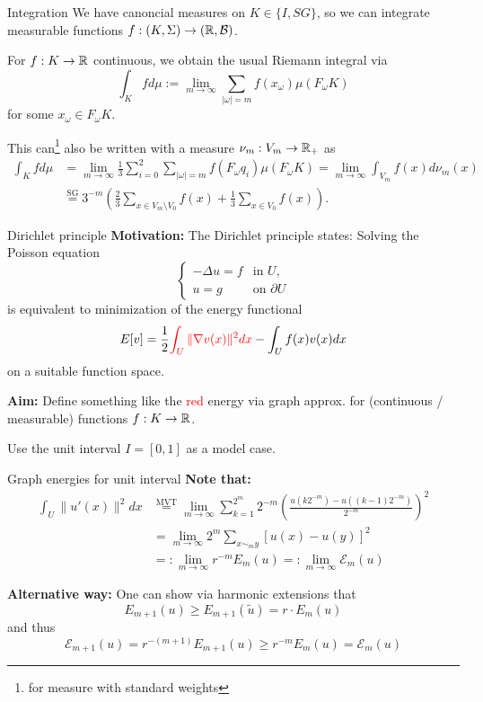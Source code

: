 \begin{frame}{Integration}
    We have canoncial measures on \(K \in \{I, SG \} \), so we can integrate measurable functions \(f: (K, \Sigma) \to (\mathbb{R}, \mathcal{B}) \).
    \begin{lemma}
        For \(f: K \to \mathbb{R} \) continuous, we obtain the usual Riemann integral via
        \[ \int_K f d\mu := \lim_{m \to \infty} \sum_{|\omega | = m} f(x_\omega) \mu(F_\omega K) \]
        for some \(x_\omega \in F_\omega K \).

        This can\footnote{for measure with standard weights} also be written with a measure \(\nu_m: V_m \to \mathbb{R}_+ \) as
        \begin{align*}
            \int_K f d\mu &= \lim_{m \to \infty} \frac{1}{3} \sum_{i=0}^2 \sum_{| \omega | = m} f(F_\omega q_i) \mu(F_\omega K)
            = \lim_{m\to \infty} \int_{V_m} f(x) d\nu_m(x) \\
            &\overset{\text{SG}}= 3^{-m} \left(\frac{2}{3} \sum_{x\in V_m \setminus V_0} f(x) + \frac{1}{3} \sum_{x \in V_0} f(x) \right).
        \end{align*}
    \end{lemma}
\end{frame}

\begin{frame}{Dirichlet principle}
    \textbf{Motivation:} The Dirichlet principle states: Solving the Poisson equation
    \[ \begin{cases}
            -\Delta u = f &\text{in } U,\\
            u = g &\text{on } \partial U
        \end{cases} \]
    is equivalent to minimization of the energy functional
    \[ E[v] = \frac{1}{2} \textcolor{red}{\int_U \| \nabla v(x) \|^2 dx} - \int_U f(x)v(x) dx \]
    on a suitable function space.

    \textbf{Aim:} Define something like the \textcolor{red}{red} energy via graph approx. for (continuous / measurable) functions \(f: K \to \mathbb{R} \).

    Use the unit interval \(I = [0, 1] \) as a model case.
\end{frame}

\begin{frame}{Graph energies for unit interval}
    \textbf{Note that:}
    \begin{align*}
        \int_U \| u'(x) \|^2 dx &\overset{\text{MVT}}= \lim_{m \to \infty} \sum_{k=1}^{2^m} 2^{-m} \left( \frac{u(k2^{-m}) - u((k-1)2^{-m})}{2^{-m}} \right)^2 \\
        &= \lim_{m \to \infty} 2^m \sum_{x \sim_m y} [ u(x) - u(y) ]^2 \\
        &=: \lim_{m \to \infty} r^{-m} E_m(u) =: \lim_{m\to\infty} \mathcal{E}_m (u)
    \end{align*}

    \textbf{Alternative way:} One can show via harmonic extensions that
    \[ E_{m+1}(u) \geq E_{m+1}(\tilde{u}) = r \cdot E_m(u) \]
    and thus
    \[ \mathcal{E}_{m+1}(u) = r^{-(m+1)} E_{m+1}(u) \geq r^{-m} E_m(u) = \mathcal{E}_m(u) \]
\end{frame}